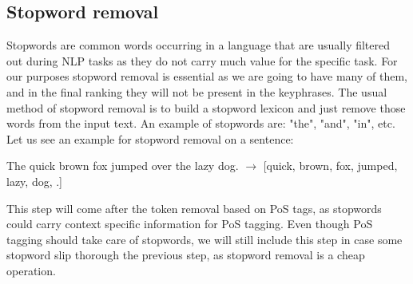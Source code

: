 \documentclass[12pt]{article}
\numberwithin{equation}{section}
\begin{document}
\begin{spacing}{1.5}
	\subsection{Stopword removal}
	Stopwords are common words occurring in a language that are usually filtered out during NLP tasks as they do not carry much value for the specific task. For our purposes stopword removal is essential as we are going to have many of them, and in the final ranking they will not be present in the keyphrases. The usual method of stopword removal is to build a stopword lexicon and just remove those words from the input text. An example of stopwords are: "the", "and", "in", etc. Let us see an example for stopword removal on a sentence:
	\begin{center}
		The quick brown fox jumped over the lazy dog. $\rightarrow$ [quick, brown, fox, jumped, lazy, dog, .]
	\end{center} 
	This step will come after the token removal based on PoS tags, as stopwords could carry context specific information for PoS tagging. Even though PoS tagging should take care of stopwords, we will still include this step in case some stopword slip thorough the previous step, as stopword removal is a cheap operation.
	

\end{spacing}
\end{document}
